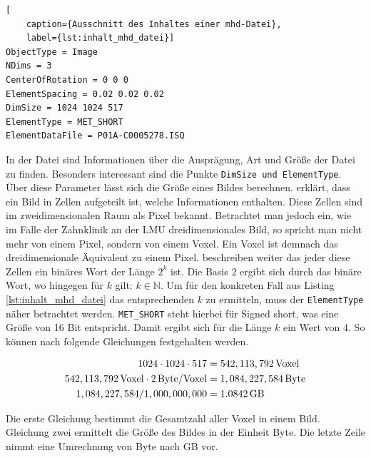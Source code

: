 \begin{lstlisting}[
	caption={Ausschnitt des Inhaltes einer mhd-Datei},
	label={lst:inhalt_mhd_datei}]
ObjectType = Image
NDims = 3
CenterOfRotation = 0 0 0
ElementSpacing = 0.02 0.02 0.02
DimSize = 1024 1024 517
ElementType = MET_SHORT
ElementDataFile = P01A-C0005278.ISQ
\end{lstlisting}

In der Datei sind Informationen über die Ausprägung, Art und Größe der Datei zu finden.
Besonders interessant sind die Punkte \texttt{DimSize und ElementType}. Über
diese Parameter lässt sich die Größe eines Bildes berechnen. \citet[S.~10-11]{burger2009}
erklärt, dass ein Bild in Zellen aufgeteilt ist, welche Informationen enthalten.
Diese Zellen sind im zweidimensionalen Raum als Pixel bekannt. Betrachtet man
jedoch ein, wie im Falle der Zahnklinik an der \ac{LMU} dreidimensionales Bild, so
spricht man nicht mehr von einem Pixel, sondern von einem Voxel. Ein Voxel ist demnach
das dreidimensionale Äquivalent zu einem Pixel. \citet[S.~10-11]{burger2009} beschreiben
weiter das jeder diese Zellen ein binäres Wort der Länge $2^{k}$ ist. Die Basis
2 ergibt sich durch das binäre Wort, wo hingegen für $k$ gilt:
$k \in \mathbb{N}$. Um für den konkreten Fall aus Listing \ref{lst:inhalt_mhd_datei}
das entsprechenden $k$ zu ermitteln, muss der \texttt{ElementType} näher betrachtet
werden. \texttt{MET\_SHORT} steht hierbei für Signed short, was eine Größe von
16 Bit entspricht. Damit ergibt sich für die Länge $k$ ein Wert von 4. So können
nach \citet[S.~10-11]{burger2009} folgende Gleichungen festgehalten werden.

\begin{align}
	\label{equ:größe_bestimmen}1024 \cdot 1024 \cdot 517    & = 542,113,792 \, \text{Voxel}\notag  \\
	542,113,792 \, \text{Voxel}\cdot 2 \, \text{Byte/Voxel} & = 1,084,227,584 \, \text{Byte}\notag \\
	1,084,227,584 / 1,000,000,000                           & = 1.0842 \, \text{GB}
\end{align}

Die erste Gleichung bestimmt die Gesamtzahl aller Voxel in einem Bild. Gleichung
zwei ermittelt die Größe des Bildes in der Einheit Byte. Die letzte Zeile nimmt eine
Umrechnung von Byte nach \ac{GB} vor.

